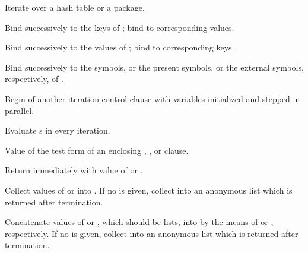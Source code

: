\begin{LIST}{1cm}
\begin{LIST}{.5cm}
\begin{LIST}{.5cm}
      {
      Iterate over a hash table or a package.
      }

      \begin{LIST}{.5cm}

        {
        Bind  successively to the keys of ; bind  to corresponding values.
        }

        {
        Bind  successively to the values of ; bind  to corresponding keys.
        }

        {
        Bind  successively to the symbols, or the present symbols, or the external symbols, respectively, of .
        }

      \end{LIST}
    \end{LIST}
    
    {
    Begin of another iteration control clause with variables initialized and stepped in parallel.
    }

    {
    Evaluate s in every iteration.
    }

    {
      Value of the test form of an enclosing , ,
      or  clause.
    }

    {
    Return immediately with value of  or .
    }

    {
    Collect values of  or  into . If no  is given, collect into an anonymous list
    which is returned after termination.
    }

    {
    Concatenate values of  or , which should be lists, into  by the means of  
    or , respectively.  If no  is given, collect into an anonymous list
    which is returned after termination.
    }


\end{LIST}
\end{LIST}
